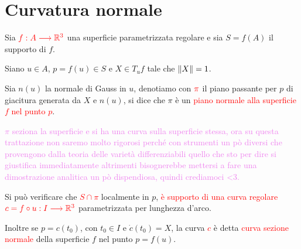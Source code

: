     \section{Curvatura normale}
        \begin{definizione}
        \mbox{}

        Sia $\textcolor{red}{f : A \longrightarrow \mathbb{R}^3}$ una superficie parametrizzata regolare e sia $S = f(A)$ il supporto di $f$. 
        
        Siano $u \in A$, $p = f(u) \in S$ e $X \in T_u f$ tale che $\lVert X\rVert = 1$.

        Sia $n(u)$ la normale di Gauss in $u$, denotiamo con $\textcolor{red}{\pi}$ il piano
         passante per $p$ di giacitura generata da $X$ e $n(u)$, si dice che $\pi$ è un
        \textcolor{red}{piano normale alla superficie $f$ nel punto $p$}.

        \textcolor{violet}{$\pi$ seziona la superficie e si ha una curva sulla superficie stessa, ora su questa
        trattazione non saremo molto rigorosi perché con strumenti un pò diversi che provengono dalla teoria
        delle varietà differenziabili quello che sto per dire si giustifica immediatamente altrimenti bisognerebbe
        mettersi a fare una dimostrazione analitica un pò dispendiosa, quindi crediamoci <3.}

        Si può verificare che \textcolor{red}{$S \cap \pi$} localmente in $p$, \textcolor{red}{è supporto di una curva regolare} $\textcolor{red}{c = f \circ u : I \longrightarrow \mathbb{R}^3}$ parametrizzata per lunghezza d'arco.
        
        Inoltre se $p = c(t_0)$, con $t_0 \in I$ e $\dot{c}(t_0) = X$, la curva \textcolor{red}{$c$}
        è detta \textcolor{red}{curva sezione normale} della superficie $f$ nel punto $p = f(u)$.
        \end{definizione}

